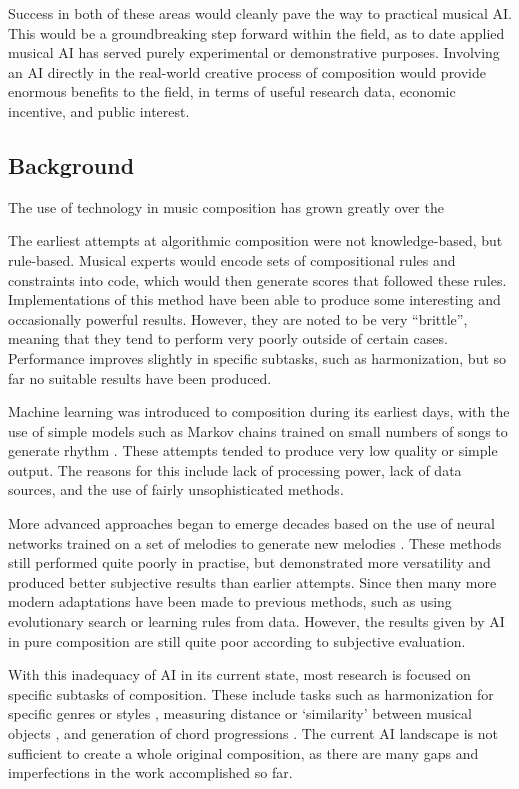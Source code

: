 \documentclass[11pt]{article}
\begin{document}
	Success in both of these areas would cleanly pave the way to practical musical AI. This would be a groundbreaking step forward within the field, as to date applied musical AI has served purely experimental or demonstrative purposes. Involving an AI directly in the real-world creative process of composition would provide enormous benefits to the field, in terms of useful research data, economic incentive, and public interest.
	
	\subsection{Background}
	
	The use of technology in music composition has grown greatly over the 
	
	
	
	
	The earliest attempts at algorithmic composition were not knowledge-based, but rule-based. Musical experts would encode sets of compositional rules and constraints into code, which would then generate scores that followed these rules. Implementations of this method have been able to produce some interesting and occasionally powerful results. However, they are noted to be very ``brittle'', meaning that they tend to perform very poorly outside of certain cases. Performance improves slightly in specific subtasks, such as harmonization, but so far no suitable results have been produced.
	
	Machine learning was introduced to composition during its earliest days, with the use of simple models such as Markov chains trained on small numbers of songs to generate rhythm \cite[]{pinkerton1956information}. These attempts tended to produce very low quality or simple output. The reasons for this include lack of processing power, lack of data sources, and the use of fairly unsophisticated methods. 
	
	More advanced approaches began to emerge decades based on the use of neural networks trained on a set of melodies to generate new melodies \cite[]{todd1989connectionist}. These methods still performed quite poorly in practise, but demonstrated more versatility and produced better subjective results than earlier attempts. Since then many more modern adaptations have been made to previous methods, such as using evolutionary search or learning rules from data. However, the results given by AI in pure composition are still quite poor according to subjective evaluation. 
	
	With this inadequacy of AI in its current state, most research is focused on specific subtasks of composition. These include tasks such as harmonization for specific genres or styles \cite{mcintyre1994bach}, measuring distance or `similarity' between musical objects \cite{horner1991genetic}, and generation of chord progressions \cite{chemillier2004toward}. The current AI landscape is not sufficient to create a whole original composition, as there are many gaps and imperfections in the work accomplished so far. 
	
\end{document}
